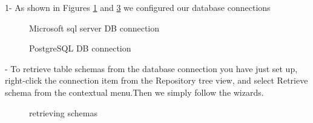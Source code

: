 1- As shown in Figures \ref{fig:sqlConec} and \ref{fig:psqlConec}  we configured our database connections
\begin{figure}[H]
\centering
{}
\caption{Microsoft sql server DB connection}
\label{fig:sqlConec}
\end{figure}

\begin{figure}[H]
\centering
{}
\caption{PostgreSQL DB connection}
\label{fig:psqlConec}
\end{figure}
\vskip0.2cm
- To retrieve table schemas from the database connection you have just set up, right-click the connection item from the Repository tree view, and select Retrieve schema from the contextual menu.Then we simply follow the wizards.

\begin{figure}[H]
\centering
{}
\caption{retrieving schemas}
\label{fig:psqlConec}
\end{figure}

